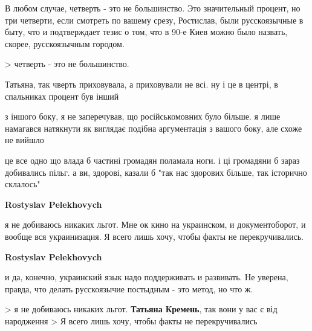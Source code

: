 \begin{itemize}
\begin{itemize}
В любом случае, четверть - это не большинство. Это значительный процент, но три
четверти, если смотреть по вашему срезу, Ростислав, были русскоязычные в быту,
что и подтверждает тезис о том, что в 90-е Киев можно было назвать, скорее,
русскоязычным городом.

 
> четверть - это не большинство.

Татьяна, так чверть приховувала, а приховували не всі. ну і це в центрі, в
спальниках процент був інший

з іншого боку, я не заперечував, що російськомовних було більше. я лише
намагався натякнути як виглядає подібна аргументація з вашого боку, але схоже
не вийшло

це все одно що влада б частині громадян поламала ноги. і ці громадяни б зараз
добивались пільг. а ви, здорові, казали б "так нас здорових більше, так
історично склалось"


 
\textbf{Rostyslav Pelekhovych} 

я не добиваюсь никаких льгот. Мне ок кино на украинском, и документоборот, и
вообще вся украинизация. Я всего лишь хочу, чтобы факты не перекручивались.


 
\textbf{Rostyslav Pelekhovych} 

и да, конечно, украинский язык надо поддерживать и развивать. Не уверена,
правда, что делать русскоязычие постыдным - это метод, но что ж.

 
> я не добиваюсь никаких льгот.
\textbf{Татьяна Кремень}, так вони у вас є від народження
> Я всего лишь хочу, чтобы факты не перекручивались


\end{itemize}
\end{itemize}
